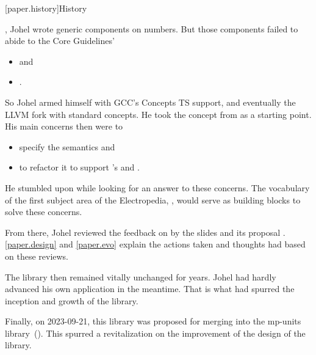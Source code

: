

[paper.history]{History}

\pnum
{}, Johel wrote generic components on numbers.
But those components failed to abide to the \Cpp{} Core Guidelines'
\begin{itemize}
\item {} and
\item {}.
\end{itemize}

\pnum
So Johel armed himself with GCC's Concepts TS support,
and eventually the LLVM fork with \Cpp{} standard concepts.
He took the  concept from  as a starting point.
His main concerns then were to
\begin{itemize}
\item specify the semantics and
\item to refactor it to support 's  and .
\end{itemize}

\pnum
He stumbled upon  while looking for an answer to these concerns.
The vocabulary of the first subject area of the Electropedia,
,
would serve as building blocks to solve these concerns.

\pnum
From there, Johel reviewed the feedback on  by the slides  and its proposal \hrefVI{}.
\ref{paper.design} and \ref{paper.evo} explain the actions taken and thoughts had based on these reviews.

\pnum
The library then remained vitally unchanged for years.
Johel had hardly advanced his own application in the meantime.
That is what had spurred the inception and growth of the library.

\pnum
Finally, on 2023-09-21, this library was proposed for merging into the mp-units library~(\hrefVII{}).
This spurred a revitalization on the improvement of the design of the library.
